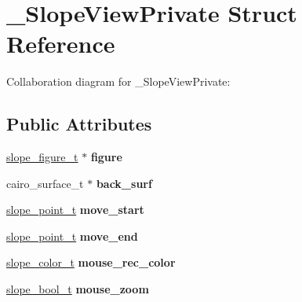 \hypertarget{struct__SlopeViewPrivate}{\section{\+\_\+\+Slope\+View\+Private Struct Reference}
\label{struct__SlopeViewPrivate}
}


Collaboration diagram for \+\_\+\+Slope\+View\+Private\+:
\subsection*{Public Attributes}
\begin{DoxyCompactItemize}
\item 
\hypertarget{struct__SlopeViewPrivate_aafdec47c695b1fb1ed2374f55d4345ae}{\hyperlink{group__Figure_ga507cc82eeca8255d6c0f603ffdaeb59e}{slope\+\_\+figure\+\_\+t} $\ast$ {\bfseries figure}}\label{struct__SlopeViewPrivate_aafdec47c695b1fb1ed2374f55d4345ae}

\item 
\hypertarget{struct__SlopeViewPrivate_aa85fbecab3e04e09e70268e513a51aad}{cairo\+\_\+surface\+\_\+t $\ast$ {\bfseries back\+\_\+surf}}\label{struct__SlopeViewPrivate_aa85fbecab3e04e09e70268e513a51aad}

\item 
\hypertarget{struct__SlopeViewPrivate_a19d3d175ce68cbf2e30cd85249e7edf6}{\hyperlink{struct__slope__point}{slope\+\_\+point\+\_\+t} {\bfseries move\+\_\+start}}\label{struct__SlopeViewPrivate_a19d3d175ce68cbf2e30cd85249e7edf6}

\item 
\hypertarget{struct__SlopeViewPrivate_a1ff87d94e9ce2bfe356f4263e67a32cd}{\hyperlink{struct__slope__point}{slope\+\_\+point\+\_\+t} {\bfseries move\+\_\+end}}\label{struct__SlopeViewPrivate_a1ff87d94e9ce2bfe356f4263e67a32cd}

\item 
\hypertarget{struct__SlopeViewPrivate_ab248d01239b98c865d508e41aa38ac1e}{\hyperlink{struct__slope__color}{slope\+\_\+color\+\_\+t} {\bfseries mouse\+\_\+rec\+\_\+color}}\label{struct__SlopeViewPrivate_ab248d01239b98c865d508e41aa38ac1e}

\item 
\hypertarget{struct__SlopeViewPrivate_afb48401b5966a0e545d0062797143176}{\hyperlink{group__Primitives_gac55afa016ca777119a6c343d1655d558}{slope\+\_\+bool\+\_\+t} {\bfseries mouse\+\_\+zoom}}\label{struct__SlopeViewPrivate_afb48401b5966a0e545d0062797143176}


\end{DoxyCompactItemize}
